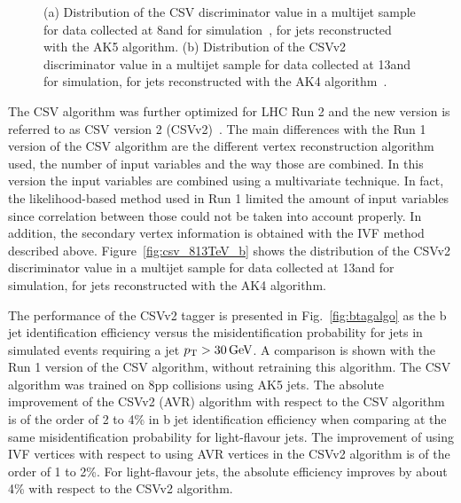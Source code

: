 \begin{figure}[!htb]
\begin{center}
\end{center} 
\caption{(a) Distribution of the CSV discriminator value in a multijet sample for data collected at 8\TeV and for simulation~\cite{CMS:BTV13001}, for jets reconstructed with the AK5 algorithm. (b) Distribution of the CSVv2 discriminator value in a multijet sample for data collected at 13\TeV and for simulation, for jets reconstructed with the AK4 algorithm~\cite{CMS-PAS-BTV-15-001}.}
\label{fig:csv_813TeV}
\end{figure}

The CSV algorithm was further optimized for LHC Run 2 and the new version is referred to as CSV version 2 (CSVv2)~\cite{CMS-PAS-BTV-15-001}. The main differences with the Run 1 version of the CSV algorithm are the different vertex reconstruction algorithm used, the number of input variables and the way those are combined. In this version the input variables are combined using a multivariate technique. In fact, the likelihood-based method used in Run 1 limited the amount of input variables since correlation between those could not be taken into account properly. In addition, the secondary vertex information is obtained with the IVF method described above. Figure~\ref{fig:csv_813TeV_b} shows the distribution of the CSVv2 discriminator value in a multijet sample for data collected at 13\TeV and for simulation, for jets reconstructed with the AK4 algorithm.

The performance of the CSVv2 tagger is presented in Fig.~\ref{fig:btagalgo} as the b jet identification efficiency versus the misidentification probability for jets in simulated \ttbar events requiring a jet $p_{\mathrm{T}} > 30\,\text{Ge\hspace{-.08em}V}$. A comparison is shown with the Run 1 version of the CSV algorithm, without retraining this algorithm. The CSV algorithm was trained on 8\TeV pp collisions using AK5 jets. The absolute improvement of the CSVv2 (AVR) algorithm with respect to the CSV algorithm is of the order of 2 to 4\% in b jet identification efficiency when comparing at the same misidentification probability for light-flavour jets. The improvement of using IVF vertices with respect to using AVR vertices in the CSVv2 algorithm is of the order of 1 to 2\%. For light-flavour jets, the absolute efficiency improves by about 4\% with respect to the CSVv2 algorithm.


